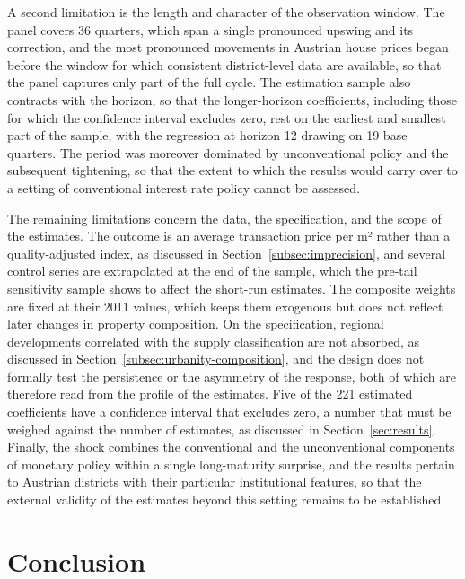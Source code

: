 \documentclass[a4paper,12pt, headsepline]{scrartcl}
\numberwithin{equation}{section}
\begin{document}
A second limitation is the length and character of the observation window. The panel covers 36 quarters, which span a single pronounced upswing and its correction, and the most pronounced movements in Austrian house prices began before the window for which consistent district-level data are available, so that the panel captures only part of the full cycle. The estimation sample also contracts with the horizon, so that the longer-horizon coefficients, including those for which the confidence interval excludes zero, rest on the earliest and smallest part of the sample, with the regression at horizon 12 drawing on 19 base quarters. The period was moreover dominated by unconventional policy and the subsequent tightening, so that the extent to which the results would carry over to a setting of conventional interest rate policy cannot be assessed.

The remaining limitations concern the data, the specification, and the scope of the estimates. The outcome is an average transaction price per m² rather than a quality-adjusted index, as discussed in Section~\ref{subsec:imprecision}, and several control series are extrapolated at the end of the sample, which the pre-tail sensitivity sample shows to affect the short-run estimates. The composite weights are fixed at their 2011 values, which keeps them exogenous but does not reflect later changes in property composition. On the specification, regional developments correlated with the supply classification are not absorbed, as discussed in Section~\ref{subsec:urbanity-composition}, and the design does not formally test the persistence or the asymmetry of the response, both of which are therefore read from the profile of the estimates. Five of the 221 estimated coefficients have a confidence interval that excludes zero, a number that must be weighed against the number of estimates, as discussed in Section~\ref{sec:results}. Finally, the shock combines the conventional and the unconventional components of monetary policy within a single long-maturity surprise, and the results pertain to Austrian districts with their particular institutional features, so that the external validity of the estimates beyond this setting remains to be established.

\section{Conclusion}\label{sec:con}
\end{document}
